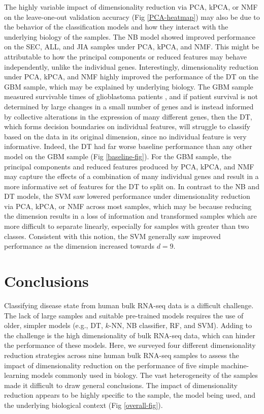 \documentclass{article}
\begin{document}
The highly variable impact of dimensionality reduction via PCA, kPCA, or NMF on the leave-one-out validation accuracy (Fig \ref{PCA-heatmap}) may also be due to the behavior of the classification models and how they interact with the underlying biology of the samples. The NB model showed improved performance on the SEC, ALL, and JIA samples under PCA, kPCA, and NMF. This might be attributable to how the principal components or reduced features may behave independently, unlike the individual genes. Interestingly, dimensionality reduction under PCA, kPCA, and NMF highly improved the performance of the DT on the GBM sample, which may be explained by underlying biology. The GBM sample measured survivable times of glioblastoma patients \cite{GBM_paper}, and if patient survival is not determined by large changes in a small number of genes and is instead informed by collective alterations in the expression of many different genes, then the DT, which forms decision boundaries on individual features, will struggle to classify based on the data in its original dimension, since no individual feature is very informative. Indeed, the DT had far worse baseline performance than any other model on the GBM sample (Fig \ref{baseline-fig}). For the GBM sample, the principal components and reduced features produced by PCA, kPCA, and NMF may capture the effects of a combination of many individual genes and result in a more informative set of features for the DT to split on. In contrast to the NB and DT models, the SVM saw lowered performance under dimensionality reduction via PCA, kPCA, or NMF across most samples, which may be because reducing the dimension results in a loss of information and transformed samples which are more difficult to separate linearly, especially for samples with greater than two classes. Consistent with this notion, the SVM generally saw improved performance as the dimension increased towards $d=9$.

\section{Conclusions}

Classifying disease state from human bulk RNA-seq data is a difficult challenge. The lack of large samples and suitable pre-trained models requires the use of older, simpler models (e.g., DT, $k$-NN, NB classifier, RF, and SVM). Adding to the challenge is the high dimensionality of bulk RNA-seq data, which can hinder the performance of these models. Here, we surveyed four different dimensionality reduction strategies across nine human bulk RNA-seq samples to assess the impact of dimensionality reduction on the performance of five simple machine-learning models commonly used in biology. The vast heterogeneity of the samples made it difficult to draw general conclusions. The impact of dimensionality reduction appears to be highly specific to the sample, the model being used, and the underlying biological context (Fig \ref{overall-fig}).
\end{document}
